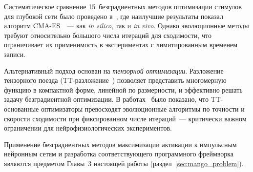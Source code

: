 Систематическое сравнение 15~безградиентных методов оптимизации стимулов для глубокой сети было проведено в~\cite{wang2022high}, где наилучшие результаты показал алгоритм CMA-ES~\cite{CMA}~--- как \textit{in silico}, так и \textit{in vivo}. Однако эволюционные методы требуют относительно большого числа итераций для сходимости, что ограничивает их применимость в экспериментах с лимитированным временем записи.

Альтернативный подход основан на \textit{тензорной оптимизации}. Разложение тензорного поезда (TT-разложение~\cite{TT-Oseledets}) позволяет представить многомерную функцию в компактной форме, линейной по размерности, и эффективно решать задачу безградиентной оптимизации. В работах~\cite{TTOpt-paper, PROTES-Chertkov-paper} было показано, что TT-основанные оптимизаторы превосходят эволюционные алгоритмы по точности и скорости сходимости при фиксированном числе итераций~--- критически важном ограничении для нейрофизиологических экспериментов.

Применение безградиентных методов максимизации активации к импульсным нейронным сетям и разработка соответствующего программного фреймворка являются предметом Главы~3 настоящей работы (раздел~\ref{sec:mango_problem}).
